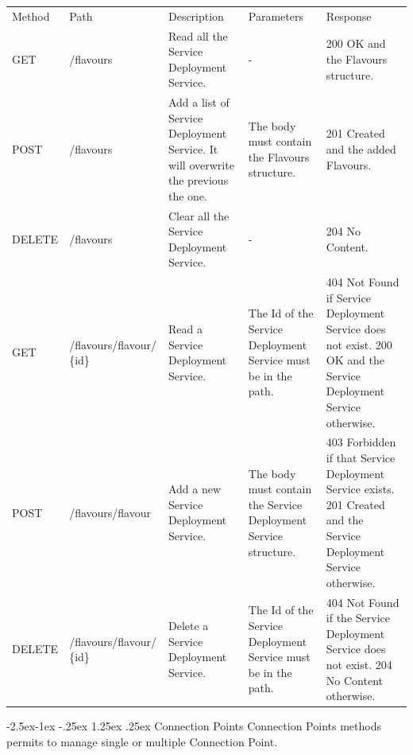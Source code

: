 \documentclass[11pt, english]{article}
\makeatletter
\renewcommand\paragraph{\@startsection{paragraph}{4}{\z@}%
            {-2.5ex\@plus -1ex \@minus -.25ex}%
            {1.25ex \@plus .25ex}%
            {\normalfont\normalsize\bfseries}}
\makeatother
\begin{document}
\begin{tabular}{ |p{2cm}|m{3cm}|p{3cm}|p{3cm}|p{4cm}| }
    \hline
    \rowcolor{black} \multicolumn{5}{|c|}{\textcolor{white}{Flavours}} \\
    \hline
    \rowcolor{Gray}
    Method & Path & Description & Parameters & Response \\
    \hline
    GET   & /flavours & Read all the Service Deployment Service. & - & 200 OK and the Flavours structure. \\
    \hline
    POST & /flavours & Add a list of Service Deployment Service. It will overwrite the previous the one. & The body must contain the Flavours structure. & 201 Created and the added Flavours. \\
    \hline
    DELETE & /flavours & Clear all the Service Deployment Service. & - & 204 No Content. \\
    \hline
    GET & /flavours/flavour/ \{id\} & Read a Service Deployment Service. & The Id of the Service Deployment Service must be in the path. & 404 Not Found if Service Deployment Service does not exist. 200 OK and the Service Deployment Service otherwise. \\
    \hline
    POST & /flavours/flavour & Add a new Service Deployment Service. & The body must contain the Service Deployment Service structure. & 403 Forbidden if that Service Deployment Service exists. 201 Created and the Service Deployment Service otherwise. \\
    \hline
    DELETE & /flavours/flavour/ \{id\} & Delete a Service Deployment Service. & The Id of the Service Deployment Service must be in the path. & 404 Not Found if the Service Deployment Service does not exist. 204 No Content otherwise. \\
    \hline
\end{tabular}

\newpage
\paragraph{Connection Points}
Connection Points methods permits to manage single or multiple Connection Point. \\
\end{document}
